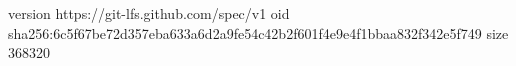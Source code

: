 version https://git-lfs.github.com/spec/v1
oid sha256:6c5f67be72d357eba633a6d2a9fe54c42b2f601f4e9e4f1bbaa832f342e5f749
size 368320
